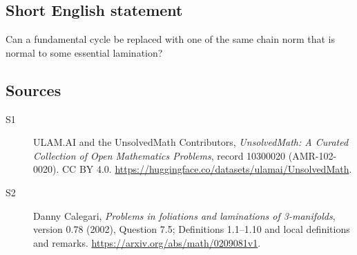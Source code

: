 \documentclass[11pt]{article}
\begin{document}
\subsection{Short English statement}
Can a fundamental cycle be replaced with one of the same chain norm that is normal to some essential lamination?
\subsection{Sources}
\begin{description}
\item[\hypertarget{source:10300020:1}{S1}] ULAM.AI and the UnsolvedMath Contributors, \emph{UnsolvedMath: A Curated Collection of Open Mathematics Problems}, record 10300020 (AMR-102-0020). CC BY 4.0. \url{https://huggingface.co/datasets/ulamai/UnsolvedMath}.
\item[\hypertarget{source:10300020:2}{S2}] Danny Calegari, \emph{Problems in foliations and laminations of 3-manifolds}, version 0.78 (2002), Question 7.5; Definitions 1.1--1.10 and local definitions and remarks. \url{https://arxiv.org/abs/math/0209081v1}.
\end{description}
\label{end:10300020}
\end{document}

